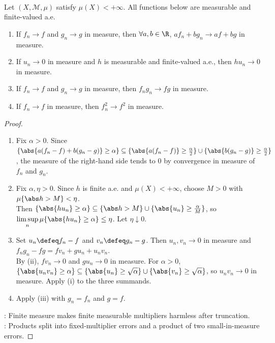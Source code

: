 \begin{proposition} \label{prop:finite-measure-algebra-convergence-in-measure} \\
Let $(X,\mathcal{M},\mu)$ satisfy $\mu(X)<+\infty$. All functions below are measurable and finite-valued a.e.
\begin{enumerate}[label=(\roman*)]
\setlength{\itemsep}{0pt}
\item If $f_n\to f$ and $g_n\to g$ in measure, then $\forall a,b\in\R$, $af_n+bg_n\to af+bg$ in measure.
\item If $u_n\to0$ in measure and $h$ is measurable and finite-valued a.e., then $hu_n\to0$ in measure.
\item If $f_n\to f$ and $g_n\to g$ in measure, then $f_ng_n\to fg$ in measure.
\item If $f_n\to f$ in measure, then $f_n^2\to f^2$ in measure.
\end{enumerate}
\begin{proof}
\begin{enumerate}[label=(\roman*)]
\setlength{\itemsep}{0pt}
\item Fix $\alpha>0$. Since $\{\abs{a(f_n-f)+b(g_n-g)}\geq\alpha\}\subseteq\{\abs{a(f_n-f)}\geq\frac{\alpha}{2}\}\cup\{\abs{b(g_n-g)}\geq\frac{\alpha}{2}\}$, the measure of the right-hand side tends to $0$ by convergence in measure of $f_n$ and $g_n$.
\item Fix $\alpha,\eta>0$. Since $h$ is finite a.e. and $\mu(X)<+\infty$, choose $M>0$ with $\mu\{\abs h>M\}<\eta$.\\
Then $\{\abs{hu_n}\geq\alpha\}\subseteq\{\abs h>M\}\cup\{\abs{u_n}\geq\frac{\alpha}{M}\}$, so $\limsup\limits_n\mu\{\abs{hu_n}\geq\alpha\}\leq\eta$. Let $\eta\downarrow0$.
\item Set $u_n\defeq f_n-f$ and $v_n\defeq g_n-g$. Then $u_n,v_n\to0$ in measure and $f_ng_n-fg=fv_n+gu_n+u_nv_n$.\\
By (ii), $fv_n\to0$ and $gu_n\to0$ in measure. For $\alpha>0$, $\{\abs{u_nv_n}\geq\alpha\}\subseteq\{\abs{u_n}\geq\sqrt{\alpha}\}\cup\{\abs{v_n}\geq\sqrt{\alpha}\}$, so $u_nv_n\to0$ in measure. Apply (i) to the three summands.
\item Apply (iii) with $g_n=f_n$ and $g=f$.
\end{enumerate}
: Finite measure makes finite measurable multipliers harmless after truncation.\\
: Products split into fixed-multiplier errors and a product of two small-in-measure errors.
\end{proof}
\end{proposition}

